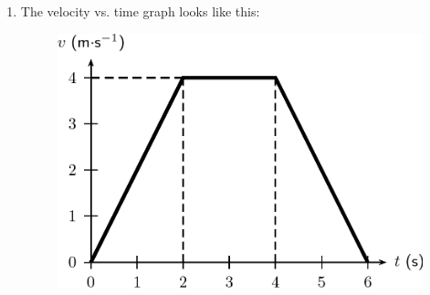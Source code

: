 {\begin{mdframed}[linewidth=4, leftmargin=40, rightmargin=40]
\begin{exercise}
\begin{enumerate}[noitemsep, label=\textbf{Step} \textbf{\arabic*}. ]
\par 
      \item  
      \label{m38795*id75549}The velocity vs. time graph looks like this:
    \setcounter{subfigure}{0}
	\begin{figure}[H] %
    \begin{center}
    \label{m38795*id75564!!!underscore!!!media}\label{m38795*id75564!!!underscore!!!printimage}\includegraphics{col11305.imgs/m38795_PG10C2_044.png} %
      \vspace{2pt}
    \vspace{.1in}
    \end{center}
 \end{figure}       
 \par 
      \end{enumerate}
    \end{exercise}
    \end{mdframed}
    }
    \noindent
   \label{m38795*secfhsst!!!underscore!!!id3332}
